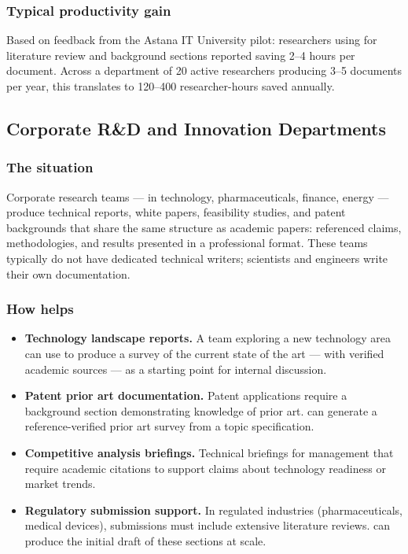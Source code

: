 \subsubsection*{Typical productivity gain}

Based on feedback from the Astana IT University pilot:
researchers using \sys{} for literature review and background sections reported
saving 2--4 hours per document.
Across a department of 20 active researchers producing 3--5 documents per year,
this translates to 120--400 researcher-hours saved annually.

\subsection{Corporate R\&D and Innovation Departments}

\subsubsection*{The situation}

Corporate research teams — in technology, pharmaceuticals, finance, energy —
produce technical reports, white papers, feasibility studies, and patent backgrounds
that share the same structure as academic papers: referenced claims, methodologies,
and results presented in a professional format.
These teams typically do not have dedicated technical writers; scientists and
engineers write their own documentation.

\subsubsection*{How \sys{} helps}

\begin{itemize}
  \item \textbf{Technology landscape reports.}
        A team exploring a new technology area can use \sys{} to produce a
        survey of the current state of the art — with verified academic sources —
        as a starting point for internal discussion.
  \item \textbf{Patent prior art documentation.}
        Patent applications require a background section demonstrating knowledge
        of prior art.
        \sys{} can generate a reference-verified prior art survey from a topic
        specification.
  \item \textbf{Competitive analysis briefings.}
        Technical briefings for management that require academic citations
        to support claims about technology readiness or market trends.
  \item \textbf{Regulatory submission support.}
        In regulated industries (pharmaceuticals, medical devices), submissions
        must include extensive literature reviews.
        \sys{} can produce the initial draft of these sections at scale.
\end{itemize}

